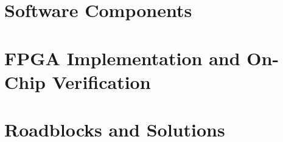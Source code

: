 \documentclass[a4paper,12pt,twoside]{book}
\begin{document}
\chapter{Software Components}\label{ch:chap6}

\clearemptydoublepage

\chapter{FPGA Implementation and On-Chip Verification}\label{ch:chap7}

\clearemptydoublepage

\chapter{Roadblocks and Solutions}\label{ch:chap8}

\clearemptydoublepage


\nocite{*}


\clearemptydoublepage


\end{document}
